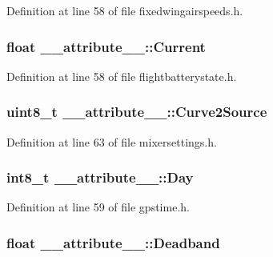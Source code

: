 \-Definition at line 58 of file fixedwingairspeeds.\-h.

\hypertarget{struct____attribute_____ac2295ffc0a545d794279e67a87b2d527}{
\subsubsection[{\-Current}]{\setlength{\rightskip}{0pt plus 5cm}float {\bf \-\_\-\-\_\-attribute\-\_\-\-\_\-\-::\-Current}}}\label{struct____attribute_____ac2295ffc0a545d794279e67a87b2d527}


\-Definition at line 58 of file flightbatterystate.\-h.

\hypertarget{struct____attribute_____a88e122b4ddb13657298d99333afa69cd}{
\subsubsection[{\-Curve2\-Source}]{\setlength{\rightskip}{0pt plus 5cm}uint8\-\_\-t {\bf \-\_\-\-\_\-attribute\-\_\-\-\_\-\-::\-Curve2\-Source}}}\label{struct____attribute_____a88e122b4ddb13657298d99333afa69cd}


\-Definition at line 63 of file mixersettings.\-h.

\hypertarget{struct____attribute_____ab1171623a435fb8bd37c7fe51343d534}{
\subsubsection[{\-Day}]{\setlength{\rightskip}{0pt plus 5cm}int8\-\_\-t {\bf \-\_\-\-\_\-attribute\-\_\-\-\_\-\-::\-Day}}}\label{struct____attribute_____ab1171623a435fb8bd37c7fe51343d534}


\-Definition at line 59 of file gpstime.\-h.

\hypertarget{struct____attribute_____a2471812acbca8164c2a48c59206ee16e}{
\subsubsection[{\-Deadband}]{\setlength{\rightskip}{0pt plus 5cm}float {\bf \-\_\-\-\_\-attribute\-\_\-\-\_\-\-::\-Deadband}}}\label{struct____attribute_____a2471812acbca8164c2a48c59206ee16e}


